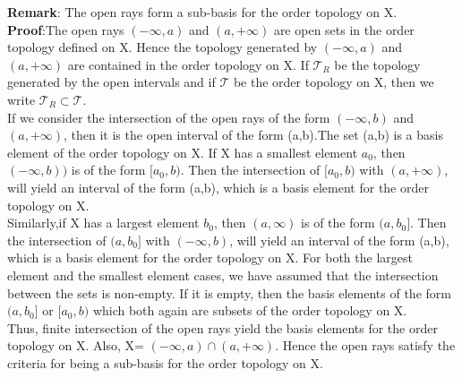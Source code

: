 \documentclass[a4paper,english,12pt]{article}
\begin{document}
\begin{defn}
{\bf Remark}: The open rays form a sub-basis for the order topology on X.\\
\vspace{2mm}
{\bf Proof}:The open rays $(-\infty,a)$ and $(a,+\infty)$ are open sets in the order topology defined on X. Hence the topology generated by $(-\infty,a)$ and $(a,+\infty)$ are contained in the order topology on X. If $\mathscr{T}_R$ be the topology generated by the open intervals and if $\mathscr{T}$ be the order topology on X, then we write $ \mathscr{T}_R\subset \mathscr{T}$. \\
\vspace{1mm}
If we consider the intersection of the open rays of the form $(-\infty,b)$ and $(a,+\infty)$, then it is the open interval of the form (a,b).The set (a,b) is a basis element of the order topology on X. If X has a smallest element $a_0$, then $(-\infty,b))$ is of the form $[a_0,b)$. Then the intersection of $[a_0,b)$ with $(a,+\infty)$, will yield an interval of the form (a,b), which is a basis element for the order topology on X. \\
\vspace{1mm}
Similarly,if X has a largest element $b_0$, then $(a,\infty)$ is of the form $(a,b_0]$. Then the intersection of $(a,b_0]$ with $(-\infty,b)$, will yield an interval of the form (a,b), which is a basis element for the order topology on X. For both the largest element and the smallest element cases, we have assumed that the intersection between the sets is non-empty. If it is empty, then the basis elements of the form $(a,b_0]$ or $[a_0,b)$ which both again are subsets of the order topology on X.\\
Thus, finite intersection of the open rays yield the basis elements for the order topology on X. Also, X= $(-\infty,a) \cap (a,+\infty)$. Hence the open rays satisfy the criteria for being a sub-basis for the order topology on X.
\vspace{3mm}


\end{defn}
\end{document}
